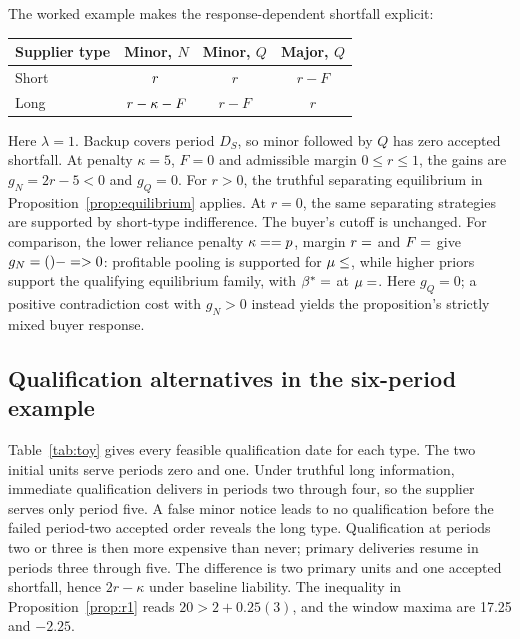 \documentclass[preprint,11pt,authoryear]{elsarticle}
\begin{document}
The worked example makes the response-dependent shortfall explicit:
\begin{center}
\begin{tabular}{lccc}\toprule
Supplier type & Minor, $N$ & Minor, $Q$ & Major, $Q$ \\ \midrule
Short & $\eqv{shortN}r$ & $r$ & $r-F$ \\
Long & $\eqv{longN}r-\kappa-F$ & $r-F$ & $r$ \\
\bottomrule\end{tabular}
\end{center}
Here $\lambda=1$. Backup covers period $D_S$, so minor followed by $Q$ has zero accepted shortfall. At penalty $\kappa=5$, $F=0$ and admissible margin $0\le r\le1$, the gains are $g_N=2r-5<0$ and $g_Q=0$. For $r>0$, the truthful separating equilibrium in Proposition~\ref{prop:equilibrium} applies. At $r=0$, the same separating strategies are supported by short-type indifference. The buyer's cutoff is unchanged. For comparison, the lower reliance penalty $\kappa=\xa{toyKappa}=p$, margin $r=\xa{toyR}$ and $F=\xa{toyF}$ give $g_N=\xa{toyDeltaD}(\xa{toyR})-\xa{toyKappa}=\xa{toyGain}>0$: profitable pooling is supported for $\mu\le\xa{toyPrior}$, while higher priors support the qualifying equilibrium family, with $\beta^*=\xa{toyBeta}$ at $\mu=\xa{toyMu}$. Here $g_Q=0$; a positive contradiction cost with $g_N>0$ instead yields the proposition's strictly mixed buyer response.

\subsection{Qualification alternatives in the six-period example}
Table~\ref{tab:toy} gives every feasible qualification date for each type. The two initial units serve periods zero and one. Under truthful long information, immediate qualification delivers in periods two through four, so the supplier serves only period five. A false minor notice leads to no qualification before the failed period-two accepted order reveals the long type. Qualification at periods two or three is then more expensive than never; primary deliveries resume in periods three through five. The difference is two primary units and one accepted shortfall, hence $2r-\kappa$ under baseline liability. The inequality in Proposition~\ref{prop:r1} reads $20>2+0.25(3)$, and the window maxima are 17.25 and $-2.25$.
\end{document}
